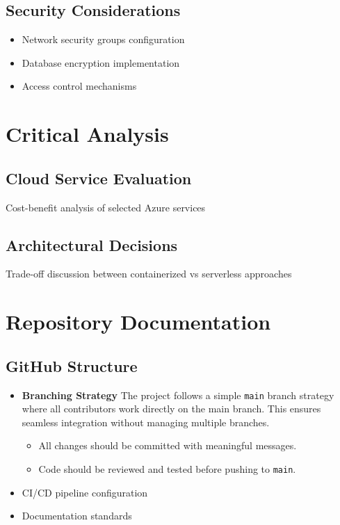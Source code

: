 \documentclass{llncs}
\begin{document}
\subsection{Security Considerations}
\begin{itemize}
    \item Network security groups configuration
    \item Database encryption implementation
    \item Access control mechanisms
\end{itemize}

\section{Critical Analysis}
\subsection{Cloud Service Evaluation}
Cost-benefit analysis of selected Azure services

\subsection{Architectural Decisions}
Trade-off discussion between containerized vs serverless approaches

\section{Repository Documentation}
\subsection{GitHub Structure}
\begin{itemize}
    \item \textbf{Branching Strategy}  
    The project follows a simple \texttt{main} branch strategy where all contributors work directly on the main branch. 
    This ensures seamless integration without managing multiple branches.  
    \begin{itemize}
        \item All changes should be committed with meaningful messages.  
        \item Code should be reviewed and tested before pushing to \texttt{main}.  
          
    \end{itemize}

    \item CI/CD pipeline configuration
    \item Documentation standards
\end{itemize}
\end{document}
